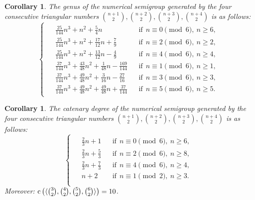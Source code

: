 \documentclass[12pt]{article}
\newtheorem{cor}[thm]{Corollary}
\theoremstyle{remark}
\begin{document}
\begin{cor}\label{corgenustriangular}
The genus of the numerical semigroup generated by the four consecutive triangular numbers $\binom{n+1}{2},\binom{n+2}{2}, \binom{n+3}{2}, \binom{n+4}{2}$ is as follows:
$$
\begin{cases}
\begin{aligned}
&\frac{25}{144} n^3 +  n^2 + \frac{5}{4} n 
    &&\text{if} \ \ n \equiv 0 \pmod{6},\ n \ge 6,\\
&\frac{25}{144} n^3 +  n^2 + \frac{17}{12} n + \frac{7}{9}
    &&\text{if} \ \ n \equiv 2 \pmod{6},\ n \ge 2,\\
&\frac{25}{144} n^3 +  n^2 + \frac{13}{12} n - \frac{4}{9}
    &&\text{if} \ \ n \equiv 4 \pmod{6},\ n \ge 4,\\
&\frac{37}{144} n^3 + \frac{43}{48} n^2 + \frac{1}{48}n - \frac{169}{144}
    &&\text{if} \ \ n \equiv 1 \pmod{6},\ n \ge 1,\\
&\frac{37}{144} n^3 + \frac{49}{48} n^2 + \frac{3}{16}n - \frac{27}{16}
    &&\text{if} \ \ n \equiv 3 \pmod{6},\ n \ge 3,\\
&\frac{37}{144} n^3 + \frac{49}{48} n^2 + \frac{49}{48}n + \frac{37}{144}
    &&\text{if} \ \ n \equiv 5 \pmod{6},\ n \ge 5.
\end{aligned}
\end{cases}
$$

    
 
\end{cor}

\begin{cor}\label{corcatenarytriangular}
The catenary degree of the numerical semigroup generated by the four consecutive triangular numbers $\binom{n+1}{2},\binom{n+2}{2}, \binom{n+3}{2}, \binom{n+4}{2}$ is as follows:
$$
\begin{cases}
\begin{aligned}
&\frac{2}{3}n + 1 
    &&\text{if} \ \ n \equiv 0 \pmod{6},\ n \ge 6,\\
&\frac{2}{3}n + \frac{5}{3}
    &&\text{if} \ \ n \equiv 2 \pmod{6},\ n \ge 8,\\
&\frac{2}{3}n + \frac{7}{3}
    &&\text{if} \ \ n \equiv 4 \pmod{6},\ n \ge 4,\\
&n+2
    &&\text{if} \ \ n \equiv 1 \pmod{2},\ n \ge 3.\\
\end{aligned}
\end{cases}
$$
Moreover: $\textup{c} \left( \langle \binom{3}{2},\binom{4}{2},\binom{5}{2},\binom{6}{2} \rangle \right) = 10$.
\end{cor}
\end{document}
